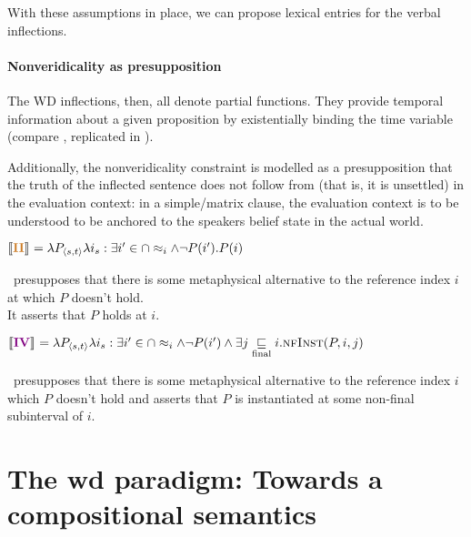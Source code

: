 \xe


With these assumptions in place, we can propose lexical entries for the verbal inflections.


\subsubsection{Nonveridicality as presupposition}

The WD inflections, then, all denote partial functions. 
They provide temporal information about a given proposition by existentially binding the time variable (compare , replicated in \nextx).

Additionally, the nonveridicality constraint is modelled as a presupposition that the truth of the inflected sentence does not follow from (that is, it is unsettled) in the evaluation context: in a simple/matrix clause, the evaluation context is to be understood to be anchored to the speakers belief state in the actual world.




\pex\a$\denote{\textbf{\II}}=\lambda P_{\langle s,t\rangle}\lambda i_s:\exists i'\in\cap\approx_i\wedge\neg P(i').P(i)$

\II~presupposes that there is some metaphysical alternative to the reference index $ i $ at which $ P $ doesn't hold.\\It asserts that $ P $ holds at $ i $.

\a$ \llbracket{\textbf{\textcolor{violet}{IV}}}\rrbracket^{}=\lambda P_{\langle s,t\rangle}\lambda i_s:\exists i'\in\cap\approx_i\wedge\neg P(i')\wedge\exists j\underset{\text{final}}{\sqsubseteq} i.\textsc{nfInst}(P,i,j)$

\IV~presupposes that there is some metaphysical alternative to the reference index $ i $  which $ P $ doesn't hold and asserts that $ P $ is instantiated at some non-final subinterval of $ i $.

\xe{}

\chapter{The \gls{wd} paradigm: Towards a compositional semantics}



